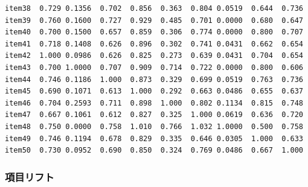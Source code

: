 \documentclass[
  a4paper,
]{ltjsbook}
\newenvironment{Shaded}{\begin{snugshade}}{\end{snugshade}}
\newcommand{\NormalTok}[1]{\textcolor[rgb]{0.00,0.23,0.31}{#1}}
\newcommand{\SpecialCharTok}[1]{\textcolor[rgb]{0.37,0.37,0.37}{#1}}
\begin{document}
\begin{verbatim}
item38  0.729 0.1356  0.702  0.856  0.363  0.804 0.0519  0.644  0.736
item39  0.760 0.1600  0.727  0.929  0.485  0.701 0.0000  0.680  0.647
item40  0.700 0.1500  0.657  0.859  0.306  0.774 0.0000  0.800  0.707
item41  0.718 0.1408  0.626  0.896  0.302  0.741 0.0431  0.662  0.654
item42  1.000 0.0986  0.626  0.825  0.273  0.639 0.0431  0.704  0.654
item43  0.700 1.0000  0.707  0.909  0.714  0.722 0.0000  0.800  0.606
item44  0.746 0.1186  1.000  0.873  0.329  0.699 0.0519  0.763  0.736
item45  0.690 0.1071  0.613  1.000  0.292  0.663 0.0486  0.655  0.637
item46  0.704 0.2593  0.711  0.898  1.000  0.802 0.1134  0.815  0.748
item47  0.667 0.1061  0.612  0.827  0.325  1.000 0.0619  0.636  0.720
item48  0.750 0.0000  0.758  1.010  0.766  1.032 1.0000  0.500  0.758
item49  0.746 0.1194  0.678  0.829  0.335  0.646 0.0305  1.000  0.633
item50  0.730 0.0952  0.690  0.850  0.324  0.769 0.0486  0.667  1.000
\end{verbatim}

\subsubsection{項目リフト}\label{ux9805ux76eeux30eaux30d5ux30c8}

\begin{Shaded}
\end{Shaded}
\end{document}
